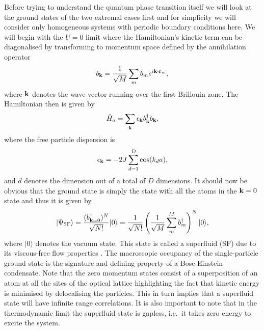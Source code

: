 Before trying to understand the quantum phase transition itself we
will look at the ground states of the two extremal cases first and for
simplicity we will consider only homogeneous systems with periodic
boundary conditions here. We will begin with the $U = 0$ limit where
the Hamiltonian's kinetic term can be diagonalised by transforming to
momentum space defined by the annihilation operator
\begin{equation}
  b_{\mathbf{k}} = \frac{1} {\sqrt{M}} \sum_m b_m e^{i \mathbf{k} \cdot \mathbf{r}_m},
\end{equation}
where $\mathbf{k}$ denotes the wave vector running over the first Brillouin
zone. The Hamiltonian then is given by
\begin{equation}
  \hat{H}_a = \sum_{\mathbf{k}} \epsilon_{\mathbf{k}} b^\dagger_{\mathbf{k}} b_{\mathbf{k}},
\end{equation}
where the free particle dispersion is
\begin{equation}
  \epsilon_{\mathbf{k}} = -2 J \sum_{d = 1}^D \cos(k_d a),
\end{equation}
and $d$ denotes the dimension out of a total of $D$ dimensions. It
should now be obvious that the ground state is simply the state with
all the atoms in the $\mathbf{k} = 0$ state and thus it is given by
\begin{equation}
  \label{eq:GSSF}
  | \Psi_\mathrm{SF} \rangle = \frac{ ( b^\dagger_{\mathbf{k} = 0} )^N } {\sqrt{N!}} | 0
  \rangle = \frac{1} {\sqrt{N!}} \left( \frac{1} {\sqrt{M}} \sum_m^M
    b^\dagger_m \right)^N | 0 \rangle,
\end{equation}
where $| 0 \rangle$ denotes the vacuum state. This state is called a
superfluid (SF) due to its viscous-free flow properties
\cite{leggett1999}. The macroscopic occupancy of the single-particle
ground state is the signature and defining property of a
Bose-Einstein condensate. Note that the zero momentum states consist of a
superposition of an atom at all the sites of the optical lattice
highlighting the fact that kinetic energy is minimised by delocalising
the particles. This in turn implies that a superfluid state will have
infinite range correlations. It is also important to note that in the
thermodynamic limit the superfluid state is gapless, i.e.~it takes
zero energy to excite the system.

